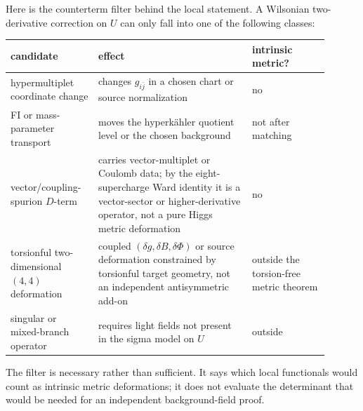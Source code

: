 Here is the counterterm filter behind the local statement.  A Wilsonian
two-derivative correction on \(U\) can only fall into one of the following
classes:
\begin{center}
\begin{tabular}{@{}>{\raggedright\arraybackslash}p{0.24\linewidth}
>{\raggedright\arraybackslash}p{0.44\linewidth}
>{\raggedright\arraybackslash}p{0.22\linewidth}@{}}
\textbf{candidate} & \textbf{effect} & \textbf{intrinsic metric?}\\ \hline
hypermultiplet coordinate change
& changes \(g_{i\bar j}\) in a chosen chart or source normalization
& no\\[0.3em]
FI or mass-parameter transport
& moves the hyperk\"ahler quotient level or the chosen background
& not after matching\\[0.3em]
vector/coupling-spurion \(D\)-term
& carries vector-multiplet or Coulomb data; by the eight-supercharge Ward
identity it is a vector-sector or higher-derivative operator, not a pure Higgs
metric deformation
& no\\[0.3em]
torsionful two-dimensional \((4,4)\) deformation
& coupled \((\delta g,\delta B,\delta\Phi)\) or source deformation constrained
by torsionful target geometry, not an independent antisymmetric add-on
& outside the torsion-free metric theorem\\[0.3em]
singular or mixed-branch operator
& requires light fields not present in the sigma model on \(U\)
& outside
\end{tabular}
\end{center}
The filter is necessary rather than sufficient.  It says which local
functionals would count as intrinsic metric deformations; it does not evaluate
the determinant that would be needed for an independent background-field proof.

